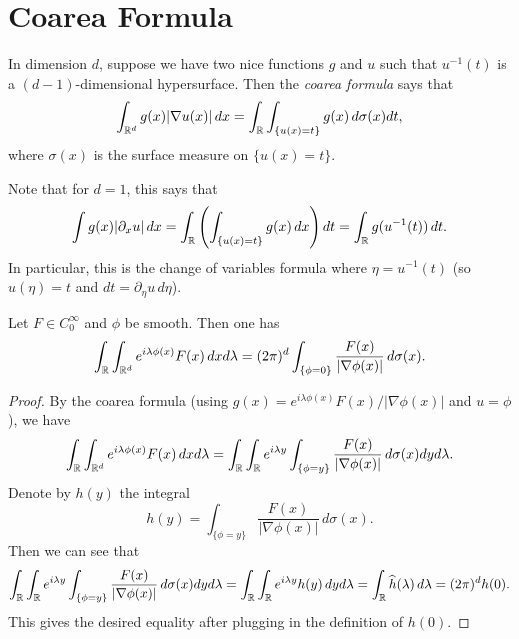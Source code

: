 \section{Coarea Formula}

\begin{remark}
  In dimension $d$, suppose we have two nice functions
  $g$ and $u$ such that $u^{-1}(t)$ is a
  $(d - 1)$-dimensional hypersurface. Then the
  \emph{coarea formula} says that
  \[
    \int_{\mathbb{R}^d} g(x) |\nabla u(x)|\, dx
    = \int_{\mathbb{R}} \int_{\{u(x) = t\}} g(x)\, d\sigma(x) dt,
  \]
  where $\sigma(x)$ is the surface measure on
  $\{u(x) = t\}$.

  Note that for $d = 1$, this says that
  \[
    \int g(x) |\partial_x u|\, dx
    = \int_{\mathbb{R}} \left(\int_{\{u(x) = t\}} g(x)\, dx\right) dt
    = \int_{\mathbb{R}} g(u^{-1}(t))\, dt.
  \]
  In particular, this is the change of
  variables formula where $\eta = u^{-1}(t)$ (so
  $u(\eta) = t$ and $dt = \partial_\eta u\, d \eta$).
\end{remark}

\begin{lemma}\label{lem:coarea-bound}
  Let $F \in C_0^\infty$ and $\phi$ be smooth. Then
  one has
  \[
    \int_{\mathbb{R}} \int_{\mathbb{R}^d} e^{i \lambda \phi(x)} F(x)\, dx d\lambda
    = (2\pi)^d \int_{\{\phi = 0\}} \frac{F(x)}{|\nabla \phi(x)|}\, d\sigma(x).
  \]
\end{lemma}

\begin{proof}
  By the coarea formula (using $g(x) = e^{i \lambda \phi(x)} F(x) / |\nabla \phi(x)|$ and $u = \phi$), we have
  \[
    \int_{\mathbb{R}} \int_{\mathbb{R}^d} e^{i\lambda \phi(x)} F(x)\, dx d\lambda
    = \int_{\mathbb{R}} \int_{\mathbb{R}} e^{i \lambda y} \int_{\{\phi = y\}} \frac{F(x)}{|\nabla \phi(x)|}\, d\sigma(x) dy d\lambda.
  \]
  Denote by $h(y)$ the integral
  \[
    h(y) = \int_{\{\phi = y\}} \frac{F(x)}{|\nabla \phi(x)|}\, d\sigma(x).
  \]
  Then we can see that
  \[
    \int_{\mathbb{R}} \int_{\mathbb{R}} e^{i \lambda y} \int_{\{\phi = y\}} \frac{F(x)}{|\nabla \phi(x)|}\, d\sigma(x) dy d\lambda
    = \int_{\mathbb{R}} \int_{\mathbb{R}} e^{i \lambda y} h(y)\, dy d\lambda
    = \int_{\mathbb{R}} \widehat{h}(\lambda)\, d\lambda
    = (2\pi)^d h(0).
  \]
  This gives the desired equality after plugging
  in the definition of $h(0)$.
\end{proof}
